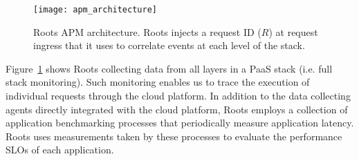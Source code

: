 %
%
\begin{figure}
\centering
\texttt{[image: apm\_architecture]}
\caption{Roots APM architecture.  Roots injects a request ID ($R$) at request
ingress that it uses to correlate events at each level of the stack.}
\label{fig:apm_architecture}
\end{figure}
%

Figure~\ref{fig:apm_architecture} shows Roots collecting data from all
layers in a PaaS stack (i.e. full stack monitoring). 
Such monitoring enables us to trace the execution of individual requests
through the cloud platform. In addition
to the data collecting agents directly integrated with the cloud platform, Roots employs
a collection of application benchmarking processes that periodically measure
application latency. Roots uses measurements taken by these processes to
evaluate the performance SLOs of each application.


